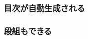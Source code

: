 \documentclass[dvipdfmx, handout]{beamer}
\begin{document}
\frame[plain]{\maketitle}

\begin{frame}{}
  \frametitle{目次が自動生成される}
  \tableofcontents
\end{frame}

\begin{frame}{}
  \frametitle{段組もできる}
    \begin{multicols}{2}
      \tableofcontents[sections={1}]
      \columnbreak
      \tableofcontents[sections={2-3}]
    \end{multicols}
\end{frame}




\end{document}
